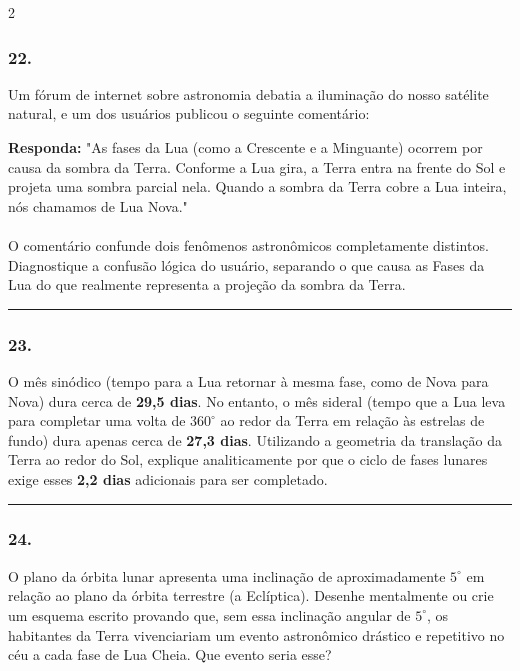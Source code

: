 \documentclass[twoside, 10pt, a4paper]{article}
\newlength{\espacoPreQuestao}
\newlength{\espacoQuestao}
\begin{document}
\begin{multicols*}{2}
\subsubsection*{22.} Um fórum de internet sobre astronomia debatia a iluminação do nosso satélite natural, e um dos usuários publicou o seguinte comentário:

\begin{boxresponda}
\textbf{Responda:} "As fases da Lua (como a Crescente e a Minguante) ocorrem por causa da sombra da Terra. Conforme a Lua gira, a Terra entra na frente do Sol e projeta uma sombra parcial nela. Quando a sombra da Terra cobre a Lua inteira, nós chamamos de Lua Nova."\\
\\
O comentário confunde dois fenômenos astronômicos completamente distintos. Diagnostique a confusão lógica do usuário, separando o que causa as Fases da Lua do que realmente representa a projeção da sombra da Terra.
\end{boxresponda}
\par\vspace{\espacoQuestao}

\noindent\textcolor{CorLinha}{\rule{\linewidth}{0.5pt}} 
\par\vspace{\espacoPreQuestao}
\subsubsection*{23.} O mês sinódico (tempo para a Lua retornar à mesma fase, como de Nova para Nova) dura cerca de \textbf{29,5 dias}. No entanto, o mês sideral (tempo que a Lua leva para completar uma volta de $360^\circ$ ao redor da Terra em relação às estrelas de fundo) dura apenas cerca de \textbf{27,3 dias}. Utilizando a geometria da translação da Terra ao redor do Sol, explique analiticamente por que o ciclo de fases lunares exige esses \textbf{2,2 dias} adicionais para ser completado.
\par\vspace{\espacoQuestao}

\noindent\textcolor{CorLinha}{\rule{\linewidth}{0.5pt}} 
\par\vspace{\espacoPreQuestao}
\subsubsection*{24.} O plano da órbita lunar apresenta uma inclinação de aproximadamente $5^\circ$ em relação ao plano da órbita terrestre (a Eclíptica). Desenhe mentalmente ou crie um esquema escrito provando que, sem essa inclinação angular de $5^\circ$, os habitantes da Terra vivenciariam um evento astronômico drástico e repetitivo no céu a cada fase de Lua Cheia. Que evento seria esse?
\par\vspace{\espacoQuestao}


\end{multicols*}
\end{document}
